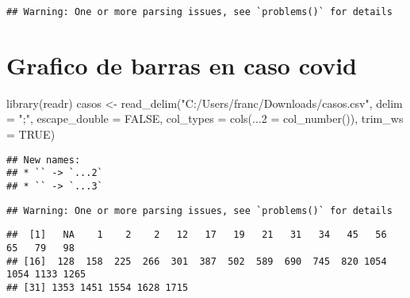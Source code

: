 \documentclass[]{elsarticle} %
\newenvironment{Shaded}{\begin{snugshade}}{\end{snugshade}}
\newcommand{\AttributeTok}[1]{\textcolor[rgb]{0.77,0.63,0.00}{#1}}
\newcommand{\ConstantTok}[1]{\textcolor[rgb]{0.00,0.00,0.00}{#1}}
\newcommand{\DecValTok}[1]{\textcolor[rgb]{0.00,0.00,0.81}{#1}}
\newcommand{\FunctionTok}[1]{\textcolor[rgb]{0.00,0.00,0.00}{#1}}
\newcommand{\NormalTok}[1]{#1}
\newcommand{\OtherTok}[1]{\textcolor[rgb]{0.56,0.35,0.01}{#1}}
\newcommand{\SpecialCharTok}[1]{\textcolor[rgb]{0.00,0.00,0.00}{#1}}
\newcommand{\StringTok}[1]{\textcolor[rgb]{0.31,0.60,0.02}{#1}}
\begin{document}
\begin{verbatim}
## Warning: One or more parsing issues, see `problems()` for details
\end{verbatim}

\hypertarget{grafico-de-barras-en-caso-covid}{%
\section{Grafico de barras en caso
covid}\label{grafico-de-barras-en-caso-covid}}

\begin{Shaded}
\begin{Highlighting}[]
\FunctionTok{library}\NormalTok{(readr)}
\NormalTok{casos }\OtherTok{\textless{}{-}} \FunctionTok{read\_delim}\NormalTok{(}\StringTok{"C:/Users/franc/Downloads/casos.csv"}\NormalTok{, }
    \AttributeTok{delim =} \StringTok{";"}\NormalTok{, }\AttributeTok{escape\_double =} \ConstantTok{FALSE}\NormalTok{, }\AttributeTok{col\_types =} \FunctionTok{cols}\NormalTok{(}\AttributeTok{...2 =} \FunctionTok{col\_number}\NormalTok{()), }
    \AttributeTok{trim\_ws =} \ConstantTok{TRUE}\NormalTok{)}
\end{Highlighting}
\end{Shaded}

\begin{verbatim}
## New names:
## * `` -> `...2`
## * `` -> `...3`
\end{verbatim}

\begin{verbatim}
## Warning: One or more parsing issues, see `problems()` for details
\end{verbatim}

\begin{Shaded}
\end{Shaded}

\begin{verbatim}
##  [1]   NA    1    2    2   12   17   19   21   31   34   45   56   65   79   98
## [16]  128  158  225  266  301  387  502  589  690  745  820 1054 1054 1133 1265
## [31] 1353 1451 1554 1628 1715
\end{verbatim}

\begin{Shaded}
\end{Shaded}
\end{document}
